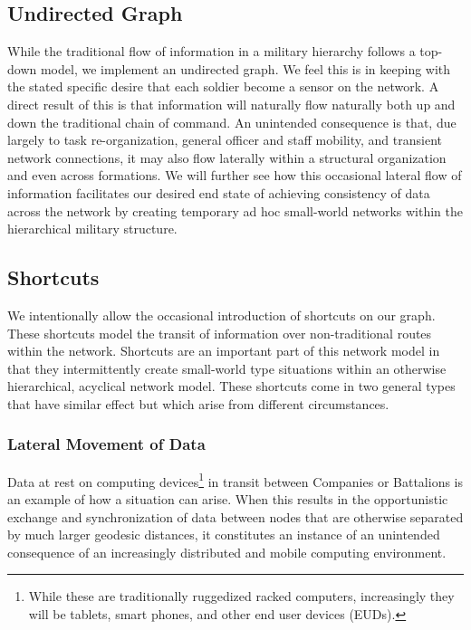\documentclass[10pt]{./IEEEtran}
\begin{document}
\subsection{Undirected Graph}
While the traditional flow of information in a military hierarchy follows a top-down model, we implement an undirected graph.  We feel this is in keeping with the stated specific desire that each soldier become a sensor on the network\cite{Patton:2003}.  A direct result of this is that information will naturally flow naturally both up and down the traditional chain of command.  An unintended consequence is that, due largely to task re-organization, general officer and staff mobility, and transient network connections, it may also flow laterally within a structural organization and even across formations.  We will further see how this occasional lateral flow of information facilitates our desired end state of achieving consistency of data across the network by creating temporary ad hoc small-world networks within the hierarchical military structure.

\subsection{Shortcuts}
We intentionally allow the occasional introduction of shortcuts on our graph.  These shortcuts model the transit of information over non-traditional routes within the network.  Shortcuts are an important part of this network model in that they intermittently create small-world type situations\cite{Vahdat:2000} within an otherwise hierarchical, acyclical network model.  These shortcuts come in two general types that have similar effect but which arise from different circumstances.

\subsubsection{Lateral Movement of Data} 
Data at rest on computing devices\footnote{While these are traditionally ruggedized racked computers, increasingly they will be tablets, smart phones, and other end user devices (EUDs).} in transit between Companies or Battalions is an example of how a situation can arise.  When this results in the opportunistic exchange and synchronization of data between nodes that are otherwise separated by much larger geodesic distances,  it constitutes an instance of an unintended consequence of an increasingly distributed and mobile computing environment.
\end{document}
